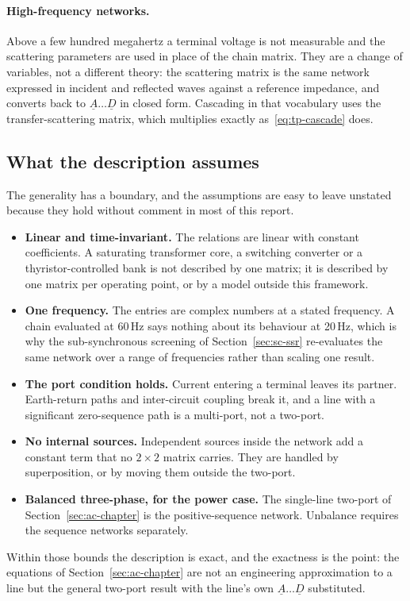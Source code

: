 \paragraph{High-frequency networks.} Above a few hundred megahertz a
terminal voltage is not measurable and the scattering parameters are used in
place of the chain matrix. They are a change of variables, not a different
theory: the scattering matrix is the same network expressed in incident and
reflected waves against a reference impedance, and converts back to
$\underline{A} \ldots \underline{D}$ in closed form. Cascading in that
vocabulary uses the transfer-scattering matrix, which multiplies exactly
as~\eqref{eq:tp-cascade} does.

\subsection{What the description assumes}
\label{sec:tp-limits}

The generality has a boundary, and the assumptions are easy to leave
unstated because they hold without comment in most of this report.

\begin{itemize}
  \setlength{\itemsep}{0.35em}
  \item \textbf{Linear and time-invariant.} The relations are linear with
        constant coefficients. A saturating transformer core, a switching
        converter or a thyristor-controlled bank is not described by one
        matrix; it is described by one matrix per operating point, or by a
        model outside this framework.
  \item \textbf{One frequency.} The entries are complex numbers at a stated
        frequency. A chain evaluated at 60\,Hz says nothing about its
        behaviour at 20\,Hz, which is why the sub-synchronous screening of
        Section~\ref{sec:sc-ssr} re-evaluates the same network over a range
        of frequencies rather than scaling one result.
  \item \textbf{The port condition holds.} Current entering a terminal
        leaves its partner. Earth-return paths and inter-circuit coupling
        break it, and a line with a significant zero-sequence path is a
        multi-port, not a two-port.
  \item \textbf{No internal sources.} Independent sources inside the network
        add a constant term that no $2 \times 2$ matrix carries. They are
        handled by superposition, or by moving them outside the two-port.
  \item \textbf{Balanced three-phase, for the power case.} The single-line
        two-port of Section~\ref{sec:ac-chapter} is the positive-sequence
        network. Unbalance requires the sequence networks separately.
\end{itemize}

Within those bounds the description is exact, and the exactness is the
point: the equations of Section~\ref{sec:ac-chapter} are not an engineering
approximation to a line but the general two-port result with the line's
own $\underline{A} \ldots \underline{D}$ substituted.

\FloatBarrier
